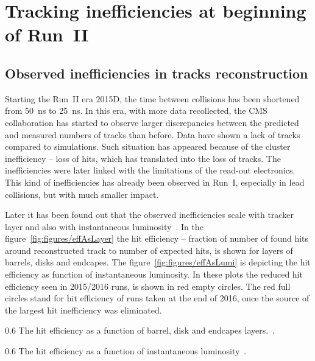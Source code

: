 
\section{Tracking inefficiencies at beginning of Run~II}

\subsection{Observed inefficiencies in tracks reconstruction}

Starting the Run~II era 2015D, the time between collisions has been shortened from 50~ns to 25~ns. In this era, with more data recollected, the CMS collaboration has started to observe larger discrepancies between the predicted and measured numbers of tracks than before. Data have shown a lack of tracks compared to simulations. Such situation has appeared because of the cluster inefficiency -- loss of hits, which has translated into the loss of tracks. The inefficiencies were later linked with the limitations of the read-out electronics. This kind of inefficiencies has already been observed in Run~I, especially in lead collisions, but with much smaller impact. 

Later it has been found out that the observed inefficiencies scale with tracker layer and also with instantaneous luminosity~\cite{website:hitEff}. In the figure~\ref{fig:figures/effAsLayer} the hit efficiency -- fraction of number of found hits around reconstructed track to number of expected hits, is shown for layers of barrels, disks and endcapes. The figure~\ref{fig:figures/effAsLumi} is depicting the hit efficiency  as function of instantaneous luminosity. In these plots the reduced hit efficiency seen in 2015/2016 runs, is shown in red empty circles. The red full circles stand for hit efficiency of runs taken at the end of 2016, once the source of the largest hit inefficiency was eliminated.


                 {0.6}       %
                 {The hit efficiency as a function of barrel, disk and endcapes layers.~\cite{website:hitEff}.} %

                 {0.6}       %
                 {The hit efficiency as a function of instantaneous luminosity~\cite{website:hitEff}.} %


